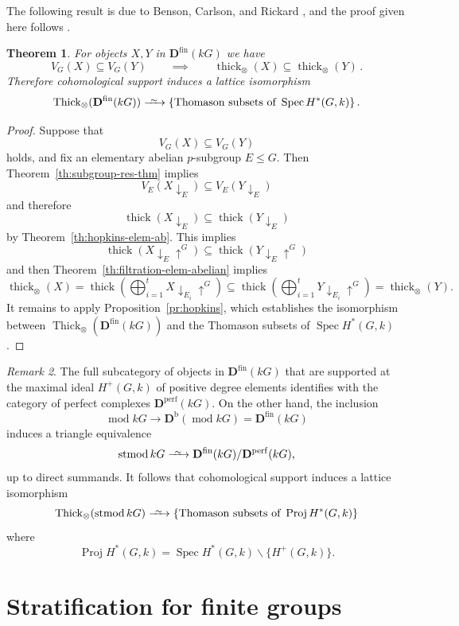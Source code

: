 \documentclass{amsart}[a4]
\newtheorem{theorem}{Theorem}[section]
\theoremstyle{definition}
\theoremstyle{remark}
\newtheorem{remark}[theorem]{Remark}
\numberwithin{equation}{section}
\renewcommand{\mod}{\operatorname{mod}}
\newcommand{\Proj}{\operatorname{Proj}}
\newcommand{\Spec}{\operatorname{Spec}}
\newcommand{\stmod}{\operatorname{stmod}}
\newcommand{\thick}{\operatorname{thick}}
\newcommand{\Thick}{\operatorname{Thick}}
\newcommand{\da}{{\downarrow}}
\newcommand{\longiso}{\xrightarrow{\
    \raisebox{-.6ex}[0ex][0ex]{$\scriptstyle{\sim}$}\ }}
\newcommand{\lto}{\longrightarrow}
\newcommand{\ua}{{\uparrow}}
\newcommand{\fin}{\mathrm{fin}}
\newcommand{\perf}{\mathrm{perf}}
\newcommand{\bfD}{\mathbf D}
\begin{document}
The following result is due to Benson, Carlson, and Rickard
\cite{Benson/Carlson/Rickard:1997a}, and the proof given here follows
\cite{Carlson/Iyengar:2015a}.

\begin{theorem}\label{th:BCR}
  For objects $X,Y$ in $\bfD^\fin(kG)$ we have
  \[V_G(X)\subseteq V_G(Y)\qquad\implies\qquad
    \thick_\otimes(X)\subseteq\thick_\otimes(Y)\,.\]
Therefore cohomological support induces a lattice isomorphism
  \begin{equation*}
    \Thick_\otimes(\bfD^\fin(kG))\longiso\{\text{Thomason subsets of }\Spec
    H^*(G,k)\}\,.
  \end{equation*}
\end{theorem}
\begin{proof}
  Suppose that \[V_G(X)\subseteq V_G(Y)\]
  holds, and fix an elementary abelian $p$-subgroup $E\le G$.  Then
  Theorem~\ref{th:subgroup-res-thm} implies
 \[V_E(X\da_E)\subseteq V_E(Y\da_E)\]
 and therefore \[\thick(X\da_E)\subseteq\thick(Y\da_E)\] by
 Theorem~\ref{th:hopkins-elem-ab}. This implies
 \[\thick(X\da_E\ua^G)\subseteq \thick(Y\da_E\ua^G)\]
 and then Theorem~\ref{th:filtration-elem-abelian} implies
 \[\thick_\otimes(X)=\thick\left(\bigoplus_{i=1}^t X\da_{E_i}\ua^G\right)
   \subseteq \thick\left(\bigoplus_{i=1}^t
     Y\da_{E_i}\ua^G\right)=\thick_\otimes(Y).\] It remains to apply
 Proposition~\ref{pr:hopkins}, which establishes the isomorphism
 between $\Thick_\otimes(\bfD^\fin(kG))$ and the Thomason subsets of
 $\Spec H^*(G,k)$.
\end{proof}

\begin{remark}
  The full subcategory of objects in $\bfD^\fin(kG)$ that are supported
  at the maximal ideal $H^+(G,k)$ of positive degree elements
  identifies with the category of perfect complexes $\bfD^\perf(kG)$.
  On the other hand, the inclusion
  \[\mod kG\lto \bfD^{\mathrm b}(\mod kG)=\bfD^\fin(kG)\] induces a
  triangle equivalence
\[\stmod kG\longiso \bfD^\fin(kG)/\bfD^\perf(kG),\]
up to direct summands. It follows that cohomological support induces a lattice isomorphism
  \begin{equation*}
    \Thick_\otimes(\stmod kG)\longiso\{\text{Thomason subsets of }\Proj
    H^*(G,k)\}
  \end{equation*}
where
  \[\Proj H^*(G,k)=\Spec H^*(G,k)\smallsetminus\{H^+(G,k)\}.\]
\end{remark}


\section{Stratification for finite groups}
\end{document}
